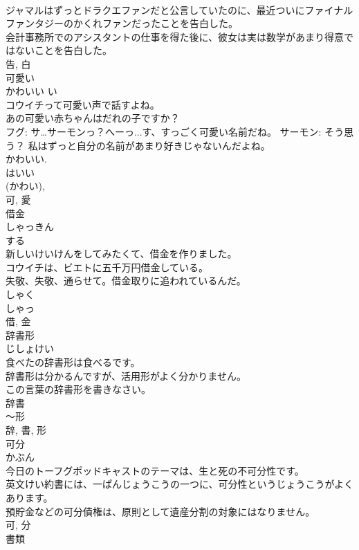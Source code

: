 \documentclass[8pt]{extreport}
\begin{document}
\begin{CJK}{UTF8}{min}
\\	ジャマルはずっとドラクエファンだと公言していたのに、最近ついにファイナルファンタジーのかくれファンだったことを告白した。	
\\	会計事務所でのアシスタントの仕事を得た後に、彼女は実は数学があまり得意ではないことを告白した。	
\\	告, 白	
\\	可愛い	
\\	かわいい	い 
\\	コウイチって可愛い声で話すよね。	
\\	あの可愛い赤ちゃんはだれの子ですか？	
\\	フグ: サ…サーモンっ？へーっ...す、すっごく可愛い名前だね。 サーモン: そう思う？ 私はずっと自分の名前があまり好きじゃないんだよね。	
\\	かわいい. 
\\	はいい
\\	(かわい), 
\\	可, 愛	
\\	借金	
\\	しゃっきん	
\\	する 
\\	新しいけいけんをしてみたくて、借金を作りました。	
\\	コウイチは、ビエトに五千万円借金している。	
\\	失敬、失敬、通らせて。借金取りに追われているんだ。	
\\	しゃく 
\\	しゃっ 
\\	借, 金	
\\	辞書形	
\\	じしょけい	
\\	食べたの辞書形は食べるです。	
\\	辞書形は分かるんですが、活用形がよく分かりません。	
\\	この言葉の辞書形を書きなさい。	
\\	辞書 
\\	〜形 
\\	辞, 書, 形	
\\	可分	
\\	かぶん	
\\	今日のトーフグポッドキャストのテーマは、生と死の不可分性です。	
\\	英文けい約書には、一ぱんじょうこうの一つに、可分性というじょうこうがよくあります。	
\\	預貯金などの可分債権は、原則として遺産分割の対象にはなりません。	
\\	可, 分	
\\	書類	

\end{CJK}
\end{document}
